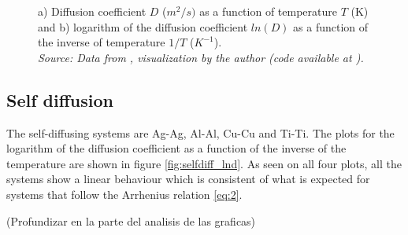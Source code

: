 \begin{figure}[H]
 \centering
 \captionsetup{justification=centering}
 \caption{a) Diffusion coefficient $D$ ($m^2/s)$ as a function of temperature $T$ (K) and b) logarithm of the diffusion coefficient $ln(D)$ as a function of the inverse of temperature $1/T$ ($K^{-1}$). \\
 \textit{Source: Data from \citep{kakusan}, visualization by the author (code available at \citep{mygit}).}}
 \label{fig:diffusion}
\end{figure}

\subsection{Self diffusion}

The self-diffusing systems are Ag-Ag, Al-Al, Cu-Cu and Ti-Ti. The plots for the logarithm of the diffusion coefficient as a function of the inverse of the temperature are shown in figure \ref{fig:selfdiff_lnd}. As seen on all four plots, all the systems show a linear behaviour which is consistent of what is expected for systems that follow the Arrhenius relation \eqref{eq:2}. 

(Profundizar en la parte del analisis de las graficas)

